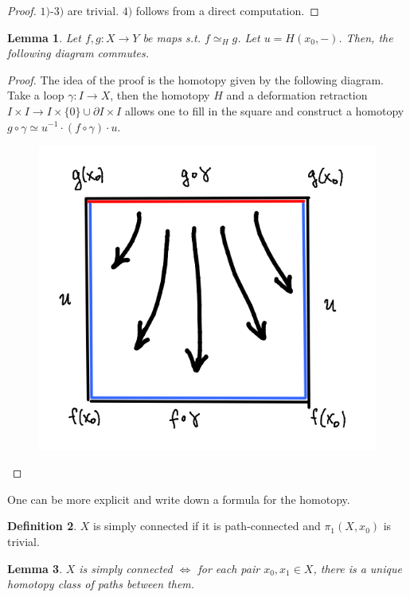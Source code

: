 \documentclass{article}
\theoremstyle{definition}
\newtheorem{defn}{Definition}[section]
\theoremstyle{remark}
\theoremstyle{plain}
\newtheorem{lem}[defn]{Lemma}
\begin{document}
\begin{proof}
    $1)$-$3)$ are trivial. $4)$ follows from a direct computation.
\end{proof}
\begin{lem}
    Let $f,g:X\to Y$ be maps s.t. $f\simeq_H g$. Let $u=H(x_0,-)$. Then, the following diagram commutes.
    \begin{center}
    \end{center}
\end{lem}
\begin{proof}
The idea of the proof is the homotopy given by the following diagram. Take a loop $\gamma:I\to X$, then the homotopy $H$ and a deformation retraction $I\times I\to I\times\{0\}\cup\partial I\times I$ allows one to fill in the square and construct a homotopy $g\circ\gamma\simeq u^{-1}\cdot(f\circ\gamma)\cdot u$.
    \begin{figure}[H]
        \centering
        \includegraphics[width=0.5\linewidth]{Mich/pictures/algtop-lemma2.15.PNG}
    \end{figure}
\end{proof}
One can be more explicit and write down a formula for the homotopy.
\begin{defn}
    $X$ is simply connected if it is path-connected and $\pi_1(X,x_0)$ is trivial.
\end{defn}
\begin{lem}
    $X$ is simply connected $\Leftrightarrow$ for each pair $x_0,x_1\in X$, there is a unique homotopy class of paths between them.
\end{lem}
\end{document}
